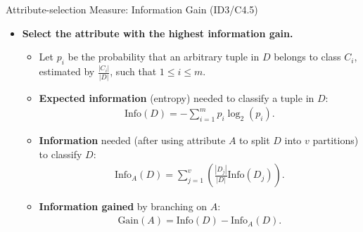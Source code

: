 \begin{frame}{Attribute-selection Measure: Information Gain (ID3/C4.5)}
	\begin{itemize}
		\item \textbf{Select the attribute with the highest information gain.}
		      \begin{itemize}
			      \item Let $p_i$ be the probability that an arbitrary tuple in $D$ belongs to class $C_i$,\\ estimated by $\frac{|C_i|}{|D|}$, such that $1 \leq i \leq m$.
			      \item \textbf{Expected information} (entropy) needed to classify a tuple in $D$:
			            \begin{align}
				            \text{Info}(D) = -\sum_{i=1}^{m}p_i \log_2(p_i).
			            \end{align}
			      \item \textbf{Information} needed (after using attribute $A$ to split $D$ into $v$ partitions) to classify $D$:
			            \begin{align}
				            \text{Info}_A(D) = \sum_{j=1}^v \left( \frac{|D_j|}{|D|} \text{Info}(D_j) \right).
			            \end{align}
			      \item \textbf{Information gained} by branching on $A$:
			            \begin{align}
				            \text{Gain}(A)=\text{Info}(D)-\text{Info}_A(D).
			            \end{align}
		      \end{itemize}
	\end{itemize}
\end{frame}

